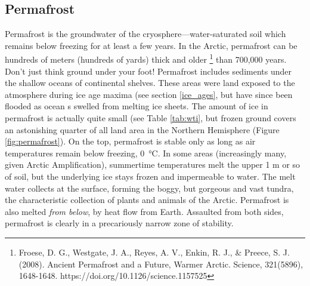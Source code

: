 \subsection{Permafrost}
Permafrost is the groundwater of the cryosphere---water-saturated soil which remains below freezing for at least a few years. In the Arctic, permafrost can be hundreds of meters (hundreds of yards) thick and older \footnote{Froese, D. G., Westgate, J. A., Reyes, A. V., Enkin, R. J., \& Preece, S. J. (2008). Ancient Permafrost and a Future, Warmer Arctic. Science, 321(5896), 1648-1648. https://doi.org/10.1126/science.1157525} than 700,000 years. Don't just think ground under your foot! Permafrost includes sediments under the shallow oceans of continental shelves. These areas were land exposed to the atmosphere during ice age maxima (see section \ref{ice_ages}, but have since been flooded as ocean s swelled from melting ice sheets. The amount of ice in permafrost is actually quite small (see Table \ref{tab:wti}, but frozen ground covers an astonishing quarter of all land area in the Northern Hemisphere (Figure \ref{fig:permafrost}). On the top, permafrost is stable only as long as air temperatures remain below freezing, \SI{0}{\celsius}. In some areas (increasingly many, given Arctic Amplification), summertime temperatures melt the upper 1 m or so of soil, but the underlying ice stays frozen and impermeable to water. The melt water collects at the surface, forming the boggy, but gorgeous and vast tundra, the characteristic collection of plants and animals of the Arctic. Permafrost is also melted \emph{from below}, by heat flow from Earth. Assaulted from both sides, permafrost is clearly in a precariously narrow zone of stability.\\ 


